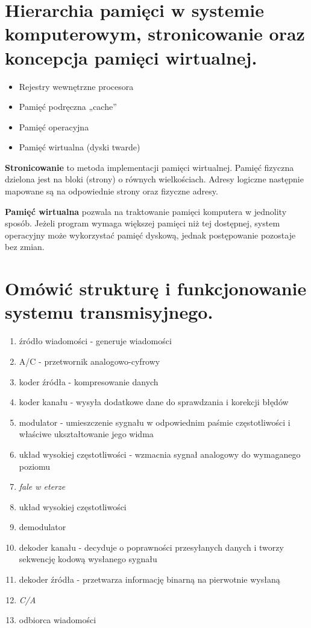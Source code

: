 \documentclass[12pt,a4paper]{article}
\begin{document}
	\section{Hierarchia pamięci w systemie komputerowym, stronicowanie oraz koncepcja pamięci wirtualnej.}
	\begin{itemize}
		\item Rejestry wewnętrzne procesora
		\item Pamięć podręczna „cache”
		\item Pamięć operacyjna
		\item Pamięć wirtualna (dyski twarde)
	\end{itemize}

	\textbf{Stronicowanie} to metoda implementacji pamięci wirtualnej. Pamięć fizyczna dzielona jest na bloki (strony) o równych wielkościach. Adresy logiczne następnie mapowane są na odpowiednie strony oraz fizyczne adresy.
	
	\textbf{Pamięć wirtualna} pozwala na traktowanie pamięci komputera w jednolity sposób. Jeżeli program wymaga większej pamięci niż tej dostępnej, system operacyjny może wykorzystać pamięć dyskową, jednak postępowanie pozostaje bez zmian.

	\section{Omówić strukturę i funkcjonowanie systemu transmisyjnego.}
	\begin{enumerate}
		\item źródło wiadomości - generuje wiadomości
		\item A/C - przetwornik analogowo-cyfrowy
		\item koder źródła - kompresowanie danych
		\item koder kanału - wysyła dodatkowe dane do sprawdzania i korekcji błędów
		\item modulator - umieszczenie sygnału w odpowiednim paśmie częstotliwości i właściwe ukształtowanie jego widma
		\item układ wysokiej częstotliwości - wzmacnia sygnał analogowy do wymaganego poziomu
		\item \textit{fale w eterze}
		\item układ wysokiej częstotliwości
		\item demodulator
		\item dekoder kanału - decyduje o poprawności przesyłanych danych i tworzy sekwencję kodową wysłanego sygnału
		\item dekoder źródła - przetwarza informację binarną na pierwotnie wysłaną
		\item \textit{C/A}
		\item odbiorca wiadomości
	\end{enumerate}
\end{document}
